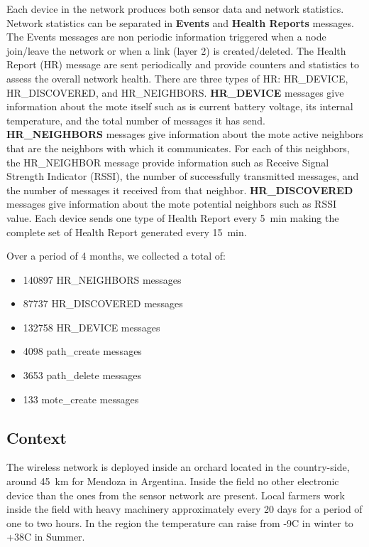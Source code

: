 \documentclass{sig-alternate}
\begin{document}

Each device in the network produces both sensor data and network statistics.
Network statistics can be separated in \textbf{Events} and \textbf{Health Reports} messages.
The Events messages are non periodic information triggered when a node join/leave the network or when a link (layer 2) is created/deleted.
The Health Report (HR) message are sent periodically and provide counters and statistics to assess the overall network health.
There are three types of HR: HR\_DEVICE, HR\_DISCOVERED, and HR\_NEIGHBORS.
\textbf{HR\_DEVICE} messages give information about the mote itself such as is current battery voltage, its internal temperature, and the total number of messages it has send.
\textbf{HR\_NEIGHBORS} messages give information about the mote active neighbors that are the neighbors with which it communicates.
For each of this neighbors, the HR\_NEIGHBOR message provide information such as Receive Signal Strength Indicator (RSSI), the number of successfully transmitted messages, and the number of messages it received from that neighbor.
\textbf{HR\_DISCOVERED} messages give information about the mote potential neighbors such as RSSI value.
Each device sends one type of Health Report every 5~min making the complete set of Health Report generated every 15~min.


Over a period of 4 months, we collected a total of:
\begin{itemize}
    \item 140897 HR\_NEIGHBORS messages
    \item 87737 HR\_DISCOVERED messages
    \item 132758 HR\_DEVICE messages
    \item 4098 path\_create messages
    \item 3653 path\_delete messages
    \item 133 mote\_create messages
\end{itemize}

\subsection{Context}

The wireless network is deployed inside an orchard located in the country-side, around 45~km for Mendoza in Argentina.
Inside the field no other electronic device than the ones from the sensor network are present.
Local farmers work inside the field with heavy machinery approximately every 20 days for a period of one to two hours.
In the region the temperature can raise from -9C in winter to +38C in Summer.
\end{document}
